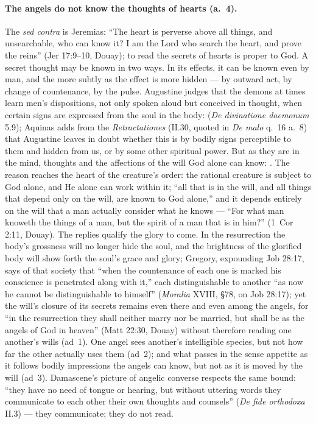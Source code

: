 \paragraph{The angels do not know the thoughts of hearts (a.~4).} The
\emph{sed contra} is Jeremias: ``The heart is perverse above all things,
and unsearchable, who can know it? I am the Lord who search the heart, and
prove the reins'' (Jer 17:9--10, Douay); to read the secrets of hearts is
proper to God. A secret thought may be known in two ways. In its effects,
it can be known even by man, and the more subtly as the effect is more
hidden --- by outward act, by change of countenance, by the pulse.
Augustine judges that the demons at times learn men's dispositions, not
only spoken aloud but conceived in thought, when certain signs are
expressed from the soul in the body:  (\emph{De divinatione daemonum}
5.9); Aquinas adds
from the \emph{Retractationes} (II.30, quoted in \emph{De malo} q.~16
a.~8) that Augustine leaves in doubt whether this is by bodily signs
perceptible to them and hidden from us, or by some other spiritual power.
But as they are in the mind, thoughts and the affections of the will God
alone can know: . The reason reaches the heart of the
creature's order: the rational creature is subject to God alone, and He
alone can work within it; ``all that is in the will, and all things that
depend only on the will, are known to God alone,'' and it depends entirely
on the will that a man actually consider what he knows --- ``For what man
knoweth the things of a man, but the spirit of a man that is in him?'' (1~Cor
 2:11, Douay). The replies qualify the glory to come. In the
resurrection the body's grossness will no longer hide the soul, and the
brightness of the glorified body will show forth the soul's grace and
glory; Gregory, expounding Job 28:17, says of that society that ``when
the countenance of each one is marked his conscience is penetrated along
with it,'' each distinguishable to another ``as now he cannot be
distinguishable to himself'' (\emph{Moralia} XVIII, \S78, on Job 28:17); yet the
will's closure of its secrets remains even there and even among the
angels, for ``in the resurrection they shall neither marry nor be married,
but shall be as the angels of God in heaven'' (Matt 22:30, Douay) without
therefore reading one another's wills (ad~1). One angel sees another's
intelligible species, but not how far the other actually uses them (ad~2);
and what passes in the sense appetite as it follows bodily impressions the
angels can know, but not as it is moved by the will (ad~3). Damascene's
picture of angelic converse respects the same bound: ``they have no need
of tongue or hearing, but without uttering words they communicate to each
other their own thoughts and counsels'' (\emph{De fide orthodoxa} II.3) ---
they communicate; they do not read.

